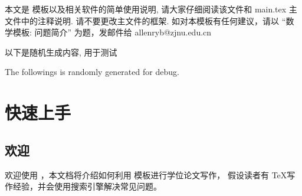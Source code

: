 \documentclass[twoside,doctor]{zjnuthesis}
\begin{document}
\maketitlecn

\maketitleen

\frontmatter
% 

\begin{Abstract}
  本文是 \ZJNUthesis 模板以及相关软件的简单使用说明,
  请大家仔细阅读该文件和 main.tex 主文件中的注释说明.
  请不要更改主文件的框架.
  如对本模板有任何建议，请以 ``数学模板: 问题简介'' 为题，发邮件给 allenryb@zjnu.edu.cn

  以下是随机生成内容, 用于测试
  
  \zhlipsum[1-5]

\end{Abstract}

\begin{EnglishAbstract}

  The followings is randomly generated for debug. 

  \zhlipsum[1-10]
  
\end{EnglishAbstract}
% 

\tableofcontents

% 
\mainmatter

\chapter{快速上手}
\section{欢迎}

欢迎使用 \ZJNUthesis，本文档将介绍如何利用 \ZJNUthesis 模板进行学位论文写作，
假设读者有 \TeX 写作经验，并会使用搜索引擎解决常见问题。
\end{document}
